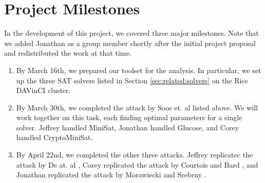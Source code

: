 \appendix
\section{Project Milestones}
\label{sec:milestones}

In the development of this project, we covered three major milestones. Note that we added Jonathan as a group member shortly after the initial project proposal and redistributed the work at that time.
\begin{enumerate}
	\item By March 16th, we prepared our toolset for the analysis. In particular, we set up the three SAT solvers listed in Section \ref{sec:related:solvers} on the Rice DAVinCI cluster.
	
	\item By March 30th, we completed the attack by Soos et. al \cite{SNC09} listed above. We will work together on this task, each finding optimal parameters for a single solver. Jeffrey handled MiniSat, Jonathan handled Glucose, and Corey handled CryptoMiniSat.
	
	\item By April 22nd, we completed the other three attacks. Jeffrey replicatec the attack by De at. al \cite{DKV07}, Corey replicated the attack by Courtois and Bard \cite{CB07}, and Jonathan replicated the attack by Morawiecki and Srebrny \cite{MS13}.
\end{enumerate}